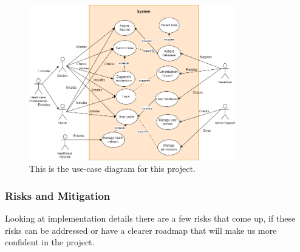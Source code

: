 \documentclass[12pt]{article}
\begin{document}
\begin{figure}[h]
  \centering
  \includegraphics[width=0.8\textwidth]{use-case.drawio.png}
  \caption{This is the use-case diagram for this project.}
  \label{fig:Use-Case Diagram}
\end{figure}

\subsubsection{Risks and Mitigation}

Looking at implementation details there are a few risks that come up, if these risks can be addressed or have a clearer roadmap that will make us more confident in the project. 
\end{document}
